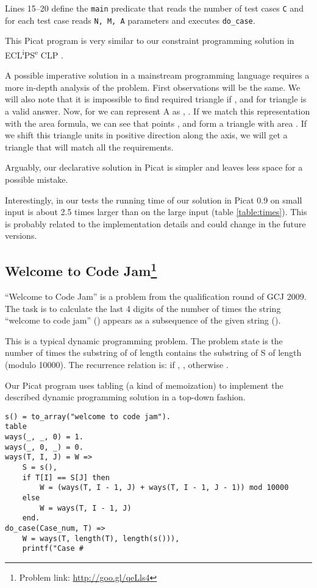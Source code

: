 \documentclass{llncs}
\begin{document}
Lines 15--20 define the \texttt{main} predicate that reads the number of test cases \texttt{C} and for each test case reads \texttt{N, M, A} parameters and executes \texttt{do\_case}.

This Picat program is very similar to our constraint programming solution in ECL\textsuperscript{i}PS\textsuperscript{e} CLP \cite{gcj-eclipse-arxiv}.

A possible imperative solution in a mainstream programming language requires a more in-depth analysis of the problem.
First observations will be the same. We will also note that it is impossible to find required triangle
if , and for  triangle  is a valid answer.
Now, for  we can represent A as , .
If we match this representation with the area formula, we can see that points , and 
form a triangle with area . If we shift this triangle  units in positive direction along the  axis, we will get
a triangle  that will match all the requirements.

Arguably, our declarative solution in Picat is simpler and leaves less space for a possible mistake.

Interestingly, in our tests the running time of our solution in Picat 0.9 on small input is about 2.5 times larger than on the large input (table \ref{table:times}).
This is probably related to the implementation details and could change in the future versions.

\subsection*{Welcome to Code Jam\footnote{Problem link: \url{http://goo.gl/qeLls4}}}

``Welcome to Code Jam'' is a problem from the qualification round of GCJ 2009.
The task is to calculate the last 4 digits of the number of times the string ``welcome to code jam'' () appears as a subsequence of the given string ().

This is a typical dynamic programming problem.
The problem state  is the number of times the substring of  of length  contains the substring of S of length  (modulo 10000).
The recurrence relation is: if , , otherwise .

Our Picat program uses tabling \cite{warren1992memoing} (a kind of memoization) to implement the described dynamic programming solution in a top-down fashion.

\begin{lstlisting}[caption={Picat solution for the ``Welcome to Code Jam'' problem}]
s() = to_array("welcome to code jam").
table
ways(_, _, 0) = 1.
ways(_, 0, _) = 0.
ways(T, I, J) = W =>
    S = s(),
    if T[I] == S[J] then
        W = (ways(T, I - 1, J) + ways(T, I - 1, J - 1)) mod 10000
    else
        W = ways(T, I - 1, J)
    end.
do_case(Case_num, T) =>
    W = ways(T, length(T), length(s())),
    printf("Case #\end{lstlisting}
\end{document}
